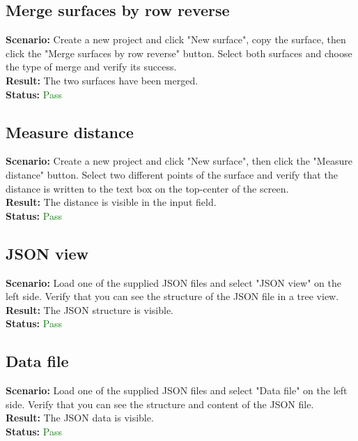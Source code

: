 \documentclass[a4paper, 11pt, article]{report}
\begin{document}
\subsection{Merge surfaces by row reverse}

\noindent \textbf{Scenario:} Create a new project and click "New surface", copy the surface, then click the "Merge surfaces by row reverse" button. Select both surfaces and choose the type of merge and verify its success.
\\
\noindent \textbf{Result:} The two surfaces have been merged.
\\
\noindent \textbf{Status:} \textcolor{green}{Pass}

\subsection{Measure distance}

\noindent \textbf{Scenario:} Create a new project and click "New surface", then click the "Measure distance" button. Select two different points of the surface and verify that the distance is written to the text box on the top-center of the screen.
\\
\noindent \textbf{Result:} The distance is visible in the input field.
\\
\noindent \textbf{Status:} \textcolor{green}{Pass}

\subsection{JSON view}

\noindent \textbf{Scenario:} Load one of the supplied JSON files and select "JSON view" on the left side. Verify that you can see the structure of the JSON file in a tree view.
\\
\noindent \textbf{Result:} The JSON structure is visible.
\\
\noindent \textbf{Status:} \textcolor{green}{Pass}

\subsection{Data file}

\noindent \textbf{Scenario:} Load one of the supplied JSON files and select "Data file" on the left side. Verify that you can see the structure and content of the JSON file.
\\
\noindent \textbf{Result:} The JSON data is visible.
\\
\noindent \textbf{Status:} \textcolor{green}{Pass}
\end{document}
